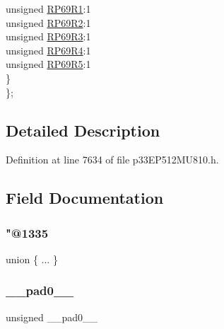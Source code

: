\begin{DoxyCompactItemize}
\begin{tabbing}
\>\>unsigned \hyperlink{structtag_r_p_o_r2_b_i_t_s_ac1d5358713a513d6cdbd8e25dc1ba407}{RP69R1}:1\\
\>\>unsigned \hyperlink{structtag_r_p_o_r2_b_i_t_s_a389968d9f9c33849c713c7d690f4a019}{RP69R2}:1\\
\>\>unsigned \hyperlink{structtag_r_p_o_r2_b_i_t_s_a6d3c5e389b267fb5085d794efa43ff83}{RP69R3}:1\\
\>\>unsigned \hyperlink{structtag_r_p_o_r2_b_i_t_s_a2fa11325c8da84c1da42c4474119885e}{RP69R4}:1\\
\>\>unsigned \hyperlink{structtag_r_p_o_r2_b_i_t_s_adb6be4ba8afcb120225d98c975a47fd9}{RP69R5}:1\\
\>\} \\
\}; \\

\end{tabbing}\end{DoxyCompactItemize}


\subsection{Detailed Description}


Definition at line 7634 of file p33\+E\+P512\+M\+U810.\+h.



\subsection{Field Documentation}
\mbox{\label{structtag_r_p_o_r2_b_i_t_s_a862f452ea65e45751fa477c7727b8d19}} 
\subsubsection{\texorpdfstring{"@1335}{@1335}}
{\footnotesize\ttfamily union \{ ... \} }

\mbox{\label{structtag_r_p_o_r2_b_i_t_s_adf71f3d8410c1f1dbbc96680a92c49af}} 
\subsubsection{\texorpdfstring{\+\_\+\+\_\+pad0\+\_\+\+\_\+}{\_\_pad0\_\_}}
{\footnotesize\ttfamily unsigned \+\_\+\+\_\+pad0\+\_\+\+\_\+}



